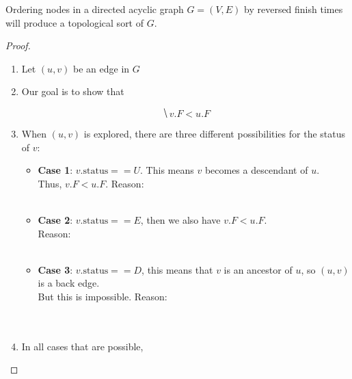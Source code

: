 \documentclass[11  pt]{exam}
\begin{document}
	\newpage
	\begin{theorem}
		Ordering nodes in a directed acyclic graph $G = (V,E)$ by reversed finish times will produce a topological sort of $G$. 
	\end{theorem}
	\begin{proof}
		\begin{enumerate}
			\item Let $(u,v)$ be an edge in $G$
			\vs{2cm}
			\item Our goal is to show that 
			
			\begin{equation*}
				\hide{v.F < u.F}
			\end{equation*}
			
			\item When $(u,v)$ is explored, there are three different possibilities for the status of $v$:
			
			\begin{itemize}
				\item \textbf{Case 1}: $v.\text{status} == U$. This means $v$ becomes a descendant of $u$. \\
				
				Thus, $v.F < u.F$. Reason: \\ \\
				
				\item \textbf{Case 2}: $v.\text{status} == E$, then we also have $v.F < u.F$.\\
				
				Reason:  \\ \\ 
				
				\item \textbf{Case 3}: $v.\text{status} == D$, this means that $v$ is an ancestor of $u$, so $(u,v)$ is a back edge. \\
				
				But this is impossible. Reason:   \\ \\ \\
				
			\end{itemize}
			\item In all cases that are possible, 
		\end{enumerate}
		
		
	\end{proof}
	
	
\end{document}
